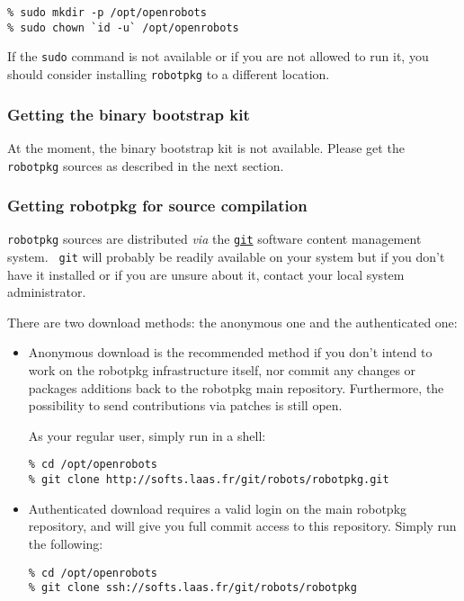 \begin{verbatim}
% sudo mkdir -p /opt/openrobots
% sudo chown `id -u` /opt/openrobots
\end{verbatim}

If the {\tt sudo} command is not available or if you are not allowed to run it,
you should consider installing {\tt robotpkg} to a different location.


\subsubsection{Getting the binary bootstrap kit}

At the moment, the  binary bootstrap kit is not  available. Please get the {\tt
robotpkg} sources as described in the next section.


\subsubsection{Getting robotpkg for source compilation}

{\tt         robotpkg}    sources   are       distributed     {\em    via}  the
\href{http://git-scm.com/}{\tt git}  software  content management system.  {\tt
git} will probably be readily available on your system but if you don't have it
installed   or if you    are  unsure  about it,   contact  your  local   system
administrator.

There are two download methods: the anonymous one and the authenticated
one:

\begin{itemize}

  \item  Anonymous download is the  recommended method if  you  don't intend to
  work on  the   robotpkg infrastructure  itself,  nor commit   any  changes or
  packages  additions  back to  the  robotpkg main repository. Furthermore, the
  possibility to send contributions via patches is still open.

  As your regular user, simply run in a shell:

\begin{verbatim}
% cd /opt/openrobots
% git clone http://softs.laas.fr/git/robots/robotpkg.git
\end{verbatim}


  \item Authenticated   download requires a  valid  login on the  main robotpkg
  repository, and will give you full commit access  to this repository.  Simply
  run the following:

\begin{verbatim}
% cd /opt/openrobots
% git clone ssh://softs.laas.fr/git/robots/robotpkg
\end{verbatim}

\end{itemize}


